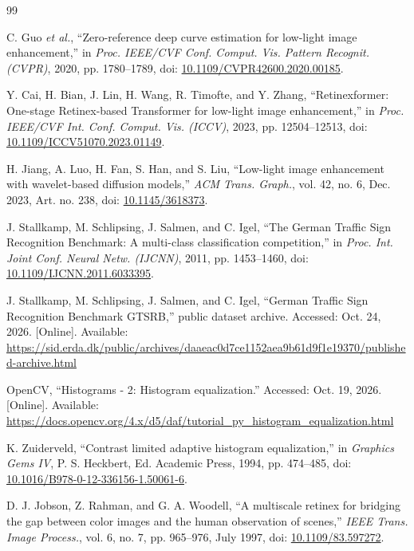 \begin{thebibliography}{99}
\raggedright
\setlength{\itemsep}{6pt}
C. Guo \textit{et al.}, ``Zero-reference deep curve estimation for low-light image enhancement,'' in \textit{Proc. IEEE/CVF Conf. Comput. Vis. Pattern Recognit. (CVPR)}, 2020, pp. 1780--1789, doi: \href{https://doi.org/10.1109/CVPR42600.2020.00185}{10.1109/CVPR42600.2020.00185}.

Y. Cai, H. Bian, J. Lin, H. Wang, R. Timofte, and Y. Zhang, ``Retinexformer: One-stage Retinex-based Transformer for low-light image enhancement,'' in \textit{Proc. IEEE/CVF Int. Conf. Comput. Vis. (ICCV)}, 2023, pp. 12504--12513, doi: \href{https://doi.org/10.1109/ICCV51070.2023.01149}{10.1109/ICCV51070.2023.01149}.

H. Jiang, A. Luo, H. Fan, S. Han, and S. Liu, ``Low-light image enhancement with wavelet-based diffusion models,'' \textit{ACM Trans. Graph.}, vol. 42, no. 6, Dec. 2023, Art. no. 238, doi: \href{https://doi.org/10.1145/3618373}{10.1145/3618373}.

J. Stallkamp, M. Schlipsing, J. Salmen, and C. Igel, ``The German Traffic Sign Recognition Benchmark: A multi-class classification competition,'' in \textit{Proc. Int. Joint Conf. Neural Netw. (IJCNN)}, 2011, pp. 1453--1460, doi: \href{https://doi.org/10.1109/IJCNN.2011.6033395}{10.1109/IJCNN.2011.6033395}.

J. Stallkamp, M. Schlipsing, J. Salmen, and C. Igel, ``German Traffic Sign Recognition Benchmark GTSRB,'' public dataset archive. Accessed: Oct. 24, 2026. [Online]. Available: \url{https://sid.erda.dk/public/archives/daaeac0d7ce1152aea9b61d9f1e19370/published-archive.html}

OpenCV, ``Histograms - 2: Histogram equalization.'' Accessed: Oct. 19, 2026. [Online]. Available: \url{https://docs.opencv.org/4.x/d5/daf/tutorial_py_histogram_equalization.html}

K. Zuiderveld, ``Contrast limited adaptive histogram equalization,'' in \textit{Graphics Gems IV}, P. S. Heckbert, Ed. Academic Press, 1994, pp. 474--485, doi: \href{https://doi.org/10.1016/B978-0-12-336156-1.50061-6}{10.1016/B978-0-12-336156-1.50061-6}.

D. J. Jobson, Z. Rahman, and G. A. Woodell, ``A multiscale retinex for bridging the gap between color images and the human observation of scenes,'' \textit{IEEE Trans. Image Process.}, vol. 6, no. 7, pp. 965--976, July 1997, doi: \href{https://doi.org/10.1109/83.597272}{10.1109/83.597272}.


\end{thebibliography}
